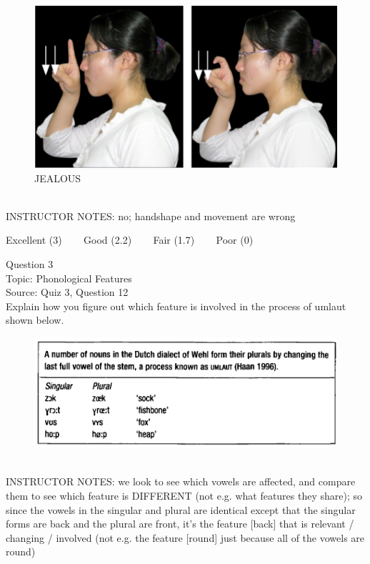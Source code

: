 \documentclass[12pt]{article}
\begin{document}
\begin{figure}[H]
\includegraphics{../images/taiwansign_jealous.png}
\caption{JEALOUS}
\end{figure}

~\\
INSTRUCTOR NOTES: no; handshape and movement are wrong


\vfill
Excellent (3) ~~~ Good (2.2) ~~~ Fair (1.7) ~~~ Poor (0)
\newpage

{\large Question 3}\\

Topic: Phonological Features\\
Source: Quiz 3, Question 12\\

Explain how you figure out which feature is involved in the process of umlaut shown below.\\

\begin{figure}[H]
\includegraphics{../images/dutch.png}
\end{figure}

~\\
INSTRUCTOR NOTES: we look to see which vowels are affected, and compare them to see which feature is DIFFERENT (not e.g. what features they share); so since the vowels in the singular and plural are identical except that the singular forms are back and the plural are front, it's the feature [back] that is relevant / changing / involved (not e.g. the feature [round] just because all of the vowels are round)
\end{document}
